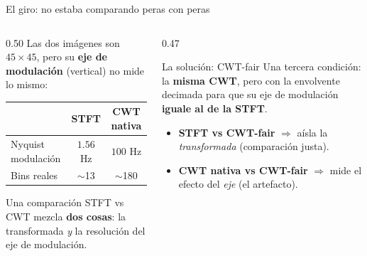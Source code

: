 \documentclass[aspectratio=169, 11pt]{beamer}
\begin{document}
\begin{frame}{El giro: no estaba comparando peras con peras}

\begin{columns}[T]
\begin{column}{0.50\textwidth}
\small
Las dos imágenes son $45\times45$, pero su \textbf{eje de modulación}
(vertical) no mide lo mismo:

\begin{table}
\centering
\scriptsize
\begin{tabular}{l c c}
\toprule
 & STFT & CWT nativa \\
\midrule
Nyquist modulación & $\mathbf{1.56}$ Hz & $100$ Hz \\
Bins reales & $\sim$13 & $\sim$180 \\
\bottomrule
\end{tabular}
\end{table}

\vfill
Una comparación STFT vs CWT mezcla \textbf{dos cosas}: la transformada
\emph{y} la resolución del eje de modulación.
\end{column}
\begin{column}{0.47\textwidth}
\begin{alertblock}{La solución: CWT-fair}
\small Una tercera condición: la \textbf{misma CWT}, pero con la
envolvente decimada para que su eje de modulación \textbf{iguale al de
la STFT}.
\end{alertblock}

\small
\begin{itemize}
    \item \textbf{STFT vs CWT-fair} $\Rightarrow$ aísla la
    \emph{transformada} (comparación justa).
    \item \textbf{CWT nativa vs CWT-fair} $\Rightarrow$ mide el efecto
    del \emph{eje} (el artefacto).
\end{itemize}
\end{column}
\end{columns}

\end{frame}
\end{document}
